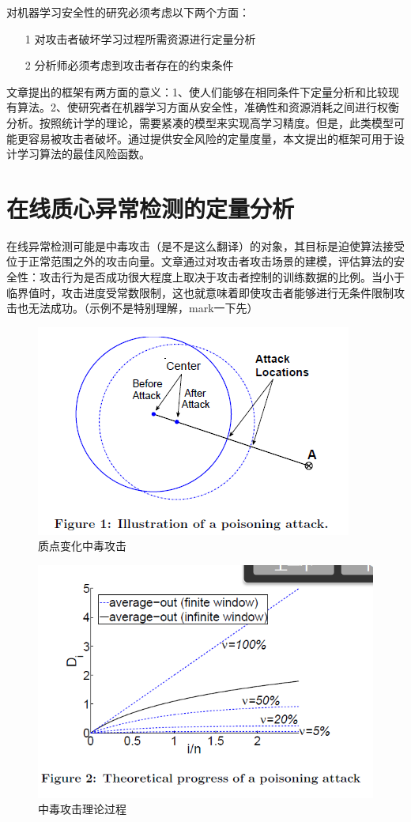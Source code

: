 \documentclass[UTF8]{ctexart}
\begin{document}
	对机器学习安全性的研究必须考虑以下两个方面：
	\begin{itemize}
		\item[1] 对攻击者破坏学习过程所需资源进行定量分析
		\item[2] 分析师必须考虑到攻击者存在的约束条件
	\end{itemize}
	文章提出的框架有两方面的意义：1、使人们能够在相同条件下定量分析和比较现有算法。2、使研究者在机器学习方面从安全性，准确性和资源消耗之间进行权衡分析。按照统计学的理论，需要紧凑的模型来实现高学习精度。但是，此类模型可能更容易被攻击者破坏。通过提供安全风险的定量度量，本文提出的框架可用于设计学习算法的最佳风险函数。
	\clearpage

	\section{在线质心异常检测的定量分析}\label{sec:disnajie}
	在线异常检测可能是中毒攻击（是不是这么翻译）的对象，其目标是迫使算法接受位于正常范围之外的攻击向量。文章通过对攻击者攻击场景的建模，评估算法的安全性：攻击行为是否成功很大程度上取决于攻击者控制的训练数据的比例。当小于临界值时，攻击进度受常数限制，这也就意味着即使攻击者能够进行无条件限制攻击也无法成功。（示例不是特别理解，mark一下先）
	\begin{figure}[ht]
        \centering
        \includegraphics[scale=0.8]{picture/001.png}
        \caption{质点变化中毒攻击}
        \label{fig:001}
    \end{figure}
    \begin{figure}[ht]
        \centering
        \includegraphics[scale=0.8]{picture/002.png}
        \caption{中毒攻击理论过程}
        \label{fig:002}
    \end{figure}
	\clearpage
\end{document}
